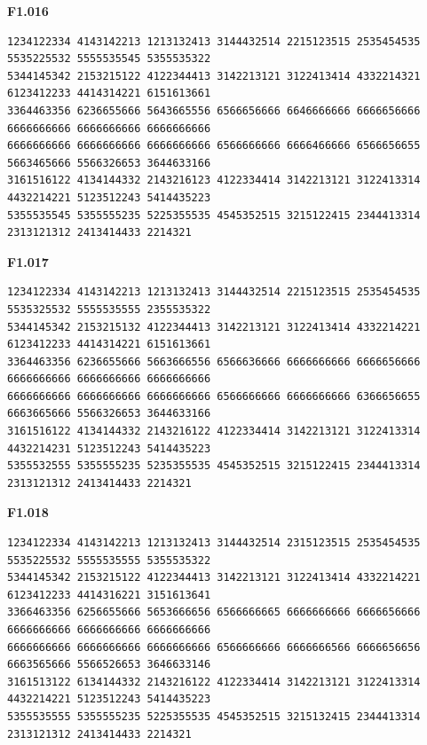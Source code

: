 \noindent\begin{minipage}{\linewidth}\textbf{F1.016}
\begin{lstlisting}
1234122334 4143142213 1213132413 3144432514 2215123515 2535454535 5535225532 5555535545 5355535322
5344145342 2153215122 4122344413 3142213121 3122413414 4332214321 6123412233 4414314221 6151613661
3364463356 6236655666 5643665556 6566656666 6646666666 6666656666 6666666666 6666666666 6666666666
6666666666 6666666666 6666666666 6566666666 6666466666 6566656655 5663465666 5566326653 3644633166
3161516122 4134144332 2143216123 4122334414 3142213121 3122413314 4432214221 5123512243 5414435223
5355535545 5355555235 5225355535 4545352515 3215122415 2344413314 2313121312 2413414433 2214321
\end{lstlisting}
\end{minipage}\par\smallskip

\noindent\begin{minipage}{\linewidth}\textbf{F1.017}
\begin{lstlisting}
1234122334 4143142213 1213132413 3144432514 2215123515 2535454535 5535325532 5555535555 2355535322
5344145342 2153215132 4122344413 3142213121 3122413414 4332214221 6123412233 4414314221 6151613661
3364463356 6236655666 5663666556 6566636666 6666666666 6666656666 6666666666 6666666666 6666666666
6666666666 6666666666 6666666666 6566666666 6666666666 6366656655 6663665666 5566326653 3644633166
3161516122 4134144332 2143216122 4122334414 3142213121 3122413314 4432214231 5123512243 5414435223
5355532555 5355555235 5235355535 4545352515 3215122415 2344413314 2313121312 2413414433 2214321
\end{lstlisting}
\end{minipage}\par\smallskip

\noindent\begin{minipage}{\linewidth}\textbf{F1.018}
\begin{lstlisting}
1234122334 4143142213 1213132413 3144432514 2315123515 2535454535 5535225532 5555535555 5355535322
5344145342 2153215122 4122344413 3142213121 3122413414 4332214221 6123412233 4414316221 3151613641
3366463356 6256655666 5653666656 6566666665 6666666666 6666656666 6666666666 6666666666 6666666666
6666666666 6666666666 6666666666 6566666666 6666666566 6666656656 6663565666 5566526653 3646633146
3161513122 6134144332 2143216122 4122334414 3142213121 3122413314 4432214221 5123512243 5414435223
5355535555 5355555235 5225355535 4545352515 3215132415 2344413314 2313121312 2413414433 2214321
\end{lstlisting}
\end{minipage}\par\smallskip

